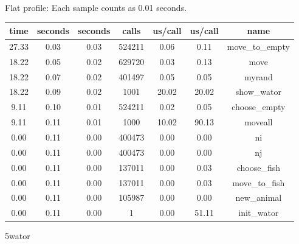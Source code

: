\documentclass[a4paper,10pt]{article}
\begin{document}
Flat profile:
Each sample counts as 0.01 seconds.
\begin{center}
  \begin{tabular}{| c | c | c | c | c | c | c |}
    \hline
 time &   seconds &   seconds &    calls &  us/call &   us/call &   name \\ \hline    
 27.33 &      0.03 &     0.03 &   524211 &     0.06 &      0.11 &   move\_to\_empty \\ \hline
 18.22 &      0.05 &     0.02 &   629720 &     0.03 &      0.13 &   move \\ \hline
 18.22 &      0.07 &     0.02 &   401497 &     0.05 &      0.05 &   myrand \\ \hline
 18.22 &      0.09 &     0.02 &     1001 &    20.02 &     20.02 &   show\_wator \\ \hline
  9.11 &      0.10 &     0.01 &   524211 &     0.02 &      0.05 &   choose\_empty \\ \hline
  9.11 &      0.11 &     0.01 &     1000 &    10.02 &     90.13 &   moveall \\ \hline
  0.00 &      0.11 &     0.00 &   400473 &     0.00 &      0.00 &   ni \\ \hline
  0.00 &      0.11 &     0.00 &   400473 &     0.00 &      0.00 &   nj \\ \hline
  0.00 &      0.11 &     0.00 &   137011 &     0.00 &      0.03 &   choose\_fish \\ \hline
  0.00 &      0.11 &     0.00 &   137011 &     0.00 &      0.03 &   move\_to\_fish \\ \hline
  0.00 &      0.11 &     0.00 &   105987 &     0.00 &      0.00 &   new\_animal \\ \hline
  0.00 &      0.11 &     0.00 &        1 &     0.00 &     51.11 &   init\_wator \\ \hline
  \end{tabular}
\end{center}
  
5wator
\end{document}
